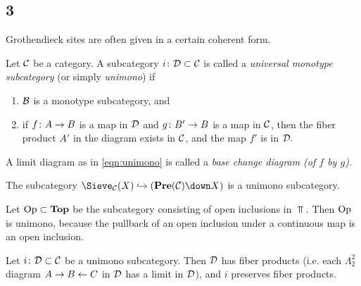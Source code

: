 \documentclass[10pt]{amsart}
\begin{document}



\subsection{3}

Grothendieck sites are often given in a certain coherent form.

\begin{definition}

Let $\mathcal{C}$ be a category.  A subcategory $i\colon\mathcal{D}\subset\mathcal{C}$ is called a {\em universal monotype subcategory} (or simply {\em unimono}) if \begin{enumerate}

\item $\mathcal{B}$ is a monotype subcategory, and
\item if $f\colon A\rightarrow B$ is a map in $\mathcal{D}$ and $g\colon B'\rightarrow B$ is a map in $\mathcal{C}$, then the fiber product $A'$ in the diagram \eeqn exists in $\mathcal{C}$, and the map $f'$ is in $\mathcal{D}.$

\end{enumerate}

A limit diagram as in \ref{eqn:unimono} is called a {\em base change diagram (of $f$ by $g$)}.

\end{definition}

\begin{example}

The subcategory $\Sieve_\mcC(X)\inj(\Pre(\mcC)\down X)$ is a unimono subcategory.

Let $\textnormal{Op}\subset{\bf Top}$ be the subcategory consisting of open inclusions in $\Top$.  Then $\textnormal{Op}$ is unimono, because the pullback of an open inclusion under a continuous map is an open inclusion.

\end{example}

\begin{lemma}

Let $i\colon\mathcal{D}\subset\mathcal{C}$ be a unimono subcategory.  Then $\mathcal{D}$ has fiber products (i.e. each $\Lambda^2_2$ diagram $A\rightarrow B\leftarrow C$ in $\mathcal{D}$ has a limit in $\mathcal{D}$), and $i$ preserves fiber products.

\end{lemma}
\end{document}
